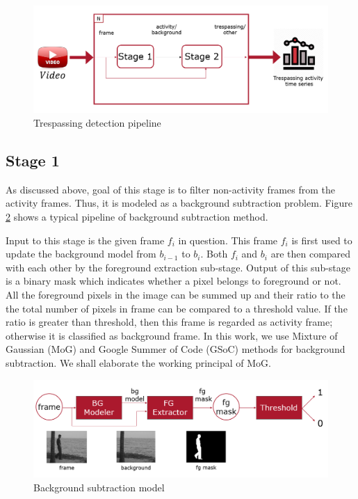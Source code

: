 \begin{figure}
    \centering
    \includegraphics[width=\linewidth]{images/trespassing-detection-pipeline.PNG}
    \caption{Trespassing detection pipeline}
    \label{fig:trespassing-detection-pipeline}
\end{figure}

\subsection{Stage 1}
As discussed above, goal of this stage is to filter non-activity frames from the activity frames. Thus, it is modeled as a background subtraction problem. Figure \ref{fig:background-subtraction-model} shows a typical pipeline of background subtraction method. 

Input to this stage is the given frame $f_i$ in question. This frame $f_i$ is first used to update the background model from $b_{i-1}$ to $b_i$. Both $f_i$ and $b_i$ are then compared with each other by the foreground extraction sub-stage. Output of this sub-stage is a binary mask which indicates whether a pixel belongs to foreground or not. All the foreground pixels in the image can be summed up and their ratio to the the total number of pixels in frame can be compared to a threshold value. If the ratio is greater than threshold, then this frame is regarded as activity frame; otherwise it is classified as background frame. In this work, we use Mixture of Gaussian (MoG) and Google Summer of Code (GSoC) methods for background subtraction. We shall elaborate the working principal of MoG. 
\begin{figure}
    \centering
    \includegraphics[width=\linewidth]{images/background-subtraction-model.PNG}
    \caption{Background subtraction model}
    \label{fig:background-subtraction-model}
\end{figure}

